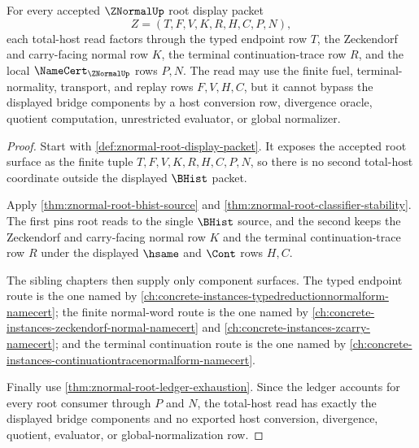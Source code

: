 \begin{theorem}\label{thm:znormal-root-total-host-bridge-components}
For every accepted $\ZNormalUp$ root display packet
$$
Z=(T,F,V,K,R,H,C,P,N),
$$
each total-host read factors through the typed endpoint row $T$, the Zeckendorf and carry-facing normal row $K$, the terminal continuation-trace row $R$, and the local $\NameCert_{\ZNormalUp}$ rows $P,N$. The read may use the finite fuel, terminal-normality, transport, and replay rows $F,V,H,C$, but it cannot bypass the displayed bridge components by a host conversion row, divergence oracle, quotient computation, unrestricted evaluator, or global normalizer.
\end{theorem}
\begin{proof}
Start with \autoref{def:znormal-root-display-packet}. It exposes the accepted root surface as the finite tuple $T,F,V,K,R,H,C,P,N$, so there is no second total-host coordinate outside the displayed $\BHist$ packet.

Apply \autoref{thm:znormal-root-bhist-source} and \autoref{thm:znormal-root-classifier-stability}. The first pins root reads to the single $\BHist$ source, and the second keeps the Zeckendorf and carry-facing normal row $K$ and the terminal continuation-trace row $R$ under the displayed $\hsame$ and $\Cont$ rows $H,C$.

The sibling chapters then supply only component surfaces. The typed endpoint route is the one named by \autoref{ch:concrete-instances-typedreductionnormalform-namecert}; the finite normal-word route is the one named by \autoref{ch:concrete-instances-zeckendorf-normal-namecert} and \autoref{ch:concrete-instances-zcarry-namecert}; and the terminal continuation route is the one named by \autoref{ch:concrete-instances-continuationtracenormalform-namecert}.

Finally use \autoref{thm:znormal-root-ledger-exhaustion}. Since the ledger accounts for every root consumer through $P$ and $N$, the total-host read has exactly the displayed bridge components and no exported host conversion, divergence, quotient, evaluator, or global-normalization row.
\end{proof}

